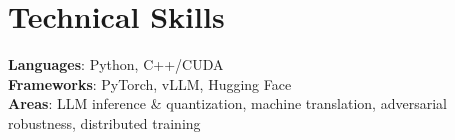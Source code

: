 \documentclass[letterpaper,11pt]{article}
\makeatletter
\newcommand{\resumeItem}[1]{
  \item\small{
    {#1 \vspace{-2pt}}
  }
}
\newcommand{\resumeProjectHeading}[2]{
    \item
    \begin{tabular*}{0.97\textwidth}{l@{\extracolsep{\fill}}r}
      \small#1 & #2 \\
    \end{tabular*}\vspace{-7pt}
}
\newcommand{\resumeSubHeadingListStart}{\begin{itemize}[leftmargin=0.15in, label={}]}
\newcommand{\resumeSubHeadingListEnd}{\end{itemize}}
\newcommand{\resumeItemListStart}{\begin{itemize}}
\newcommand{\resumeItemListEnd}{\end{itemize}\vspace{-5pt}}
\makeatother
\begin{document}
\section{Technical Skills}
 \begin{itemize}[leftmargin=0.15in, label={}]
    \small{\item{
     \textbf{Languages}{: Python, C++/CUDA} \\
     \textbf{Frameworks}{: PyTorch, vLLM, Hugging Face} \\
     \textbf{Areas}{: LLM inference \& quantization, machine translation, adversarial robustness, distributed training}
    }}
 \end{itemize}

 
%
%
\end{document}
